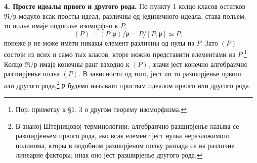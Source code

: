 \documentclass[11pt]{article}
\begin{document}
\setcounter{footnote}{20}

\textbf{4. Просте идеалы првого и другого рода.} По пункту 1 колцо класов остатков $\mathfrak R/\mathfrak p$ модуло всак просты идеал, различны од јединичного идеала, става польем; то полье имаје подполье изоморфно к $P$,
\[
   (P)=(P,\mathfrak p)/\mathfrak p=P/[P,\mathfrak p]\simeq P,
\]
понеже $\mathfrak p$ не може имети никакы елемент различны од нулы из $P$. Зато $(P)$ состоји из всих и само тых класов, кторе можно представити елементами из $P$.\footnote{Пор. приметку к \S 1, 3 о другом теорему изоморфизма.} Колцо $\mathfrak R/\mathfrak p$ имаје конечны ранг взходно к $(P)$, значи јест конечно алгебраично разширјенье польа $(P)$. В зависности од того, јест ли то разширјенье првого али другого рода,\footnote{В знаној Штејницовој терминологији: алгебраично разширјенье называ се разширјеньем првого рода, ако всак елемент јест нульа неразложимого полинома, кторы в подобном разширјеном польу разпада се на различне линеарне факторы; инак оно јест разширјенье другого рода.} $\mathfrak p$ будемо называти простым идеалом првого или другого рода.
\end{document}
